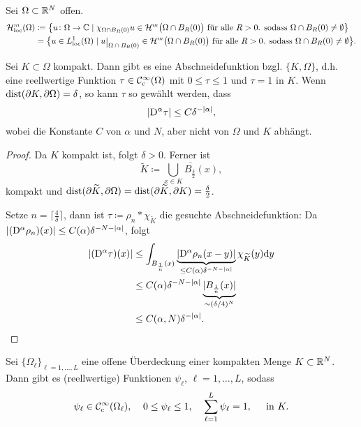 \begin{definition}
	Sei \(\Omega\subset\mathbb{R}^N\) offen.
	\begin{align*}
		\Hloc^m(\Omega)&\coloneqq\big\{\func{u}{\Omega}{\C}\mid\chi_{\Omega\cap B_R(0)}u\in\H^m\big(\Omega\cap B_R(0)\big)\te{ für alle }R>0\te{. sodass }\Omega\cap B_R(0)\neq\emptyset\big\}\\
		&=\big\{u \in \Lloc^1(\Omega)\mid u\restrict{\Omega\cap B_R(0)}\in\H^m\big(\Omega\cap B_R(0)\big)\te{ für alle }R>0\te{. sodass }\Omega\cap B_R(0)\neq\emptyset\big\}.
	\end{align*}
\end{definition}
\begin{lem}\label{lem: abschneidefunktionen}
	Sei \(K\subset\Omega\) kompakt. Dann gibt es eine Abschneidefunktion bzgl. \(\{K,\Omega\}\), d.h. eine reellwertige Funktion \(\tau\in\mathcal{C}_{\mathrm{c}}^\infty(\Omega)\) mit \(0\leq\tau\leq1\) und \(\tau=1\) in \(K\). Wenn \(\operatorname{dist}(\partial K,\partial\Omega)=\delta\), so kann \(\tau\) so gewählt werden, dass
	\begin{equation*}
		|\mathrm{D}^\alpha\tau|\leq C\delta^{-|\alpha|},
	\end{equation*}
	wobei die Konstante \(C\) von \(\alpha\) und \(N\), aber nicht von \(\Omega\) und \(K\) abhängt.
\end{lem}
\begin{proof}
	Da \(K\) kompakt ist, folgt \(\delta>0\). Ferner ist
	\begin{equation*}
		\widetilde{K}\coloneqq\overline{\bigcup_{x\in K}B_\frac{\delta}{2}(x)},
	\end{equation*}
	kompakt und \(\operatorname{dist}(\partial\widetilde{K},\partial\Omega)=\operatorname{dist}(\partial\widetilde{K},\partial K)=\frac{\delta}{2}\).\vspace{2.5cm}
	
	
	Setze \(n=\big\lceil\frac{4}{\delta}\big\rceil\), dann ist \(\tau\coloneqq\rho_n\ast\chi_{\widetilde{K}}\) die gesuchte Abschneidefunktion: Da \(|(\mathrm{D}^\alpha\rho_n)(x)|\leq C(\alpha)\delta^{-N-|\alpha|}\), folgt
	\begin{align*}
		|(\mathrm{D}^\alpha\tau)(x)|&
		\leq\int_{B_\frac{1}{n}(x)}\underbrace{|\mathrm{D}^\alpha\rho_n(x-y)|}_{\leq C(\alpha)\delta^{-N-|\alpha|}}\chi_{\widetilde{K}}(y)\mathrm{d}y\\
		&\leq C(\alpha)\delta^{-N-|\alpha|}\underbrace{|B_\frac{1}{n}(x)|}_{\sim(\delta/4)^N}\\
		&\leq C(\alpha,N)\delta^{-|\alpha|}.
	\end{align*}
\end{proof}
\begin{lem}\label{lem: zerlegung der eins}
	Sei \(\{\Omega_\ell\}_{\ell=1,\ldots,L}\) eine offene Überdeckung einer kompakten Menge \(K\subset\mathbb{R}^N\). Dann gibt es (reellwertige) Funktionen \(\psi_\ell\), \(\ell=1,\ldots,L\), sodass
	\begin{equation*}
		\psi_\ell\in\mathcal{C}_{\mathrm{c}}^\infty(\Omega_\ell),\;\;\;\;0\leq\psi_\ell\leq1,\;\;\;\;\sum_{\ell=1}^L\psi_\ell=1,\;\;\;\;\text{ in }K.
	\end{equation*}
\end{lem}
